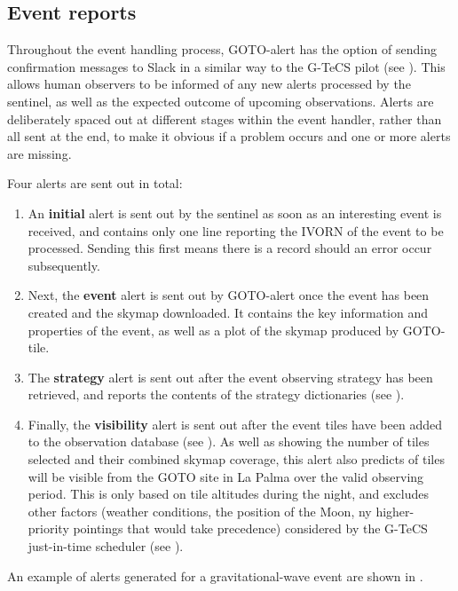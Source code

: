 
\subsection{Event reports}
\label{sec:event_slack}
\begin{colsection}

Throughout the event handling process, GOTO-alert has the option of sending confirmation messages to Slack in a similar way to the G-TeCS pilot (see ). This allows human observers to be informed of any new alerts processed by the sentinel, as well as the expected outcome of upcoming observations. Alerts are deliberately spaced out at different stages within the event handler, rather than all sent at the end, to make it obvious if a problem occurs and one or more alerts are missing.

Four alerts are sent out in total:
%
\begin{enumerate}
    \item An \textbf{initial} alert is sent out by the sentinel as soon as an interesting event is received, and contains only one line reporting the IVORN of the event to be processed. Sending this first means there is a record should an error occur subsequently.
    \item Next, the \textbf{event} alert is sent out by GOTO-alert once the event has been created and the skymap downloaded. It contains the key information and properties of the event, as well as a plot of the skymap produced by GOTO-tile.
    \item The \textbf{strategy} alert is sent out after the event observing strategy has been retrieved, and reports the contents of the strategy dictionaries (see ).
    \item Finally, the \textbf{visibility} alert is sent out after the event tiles have been added to the observation database (see ). As well as showing the number of tiles selected and their combined skymap coverage, this alert also predicts of tiles will be visible from the GOTO site in La Palma over the valid observing period. This is only based on tile altitudes during the night, and excludes other factors (weather conditions, the position of the Moon, ny higher-priority pointings that would take precedence) considered by the G-TeCS just-in-time scheduler (see ).
\end{enumerate}
%
An example of alerts generated for a gravitational-wave event are shown in .


\end{colsection}
